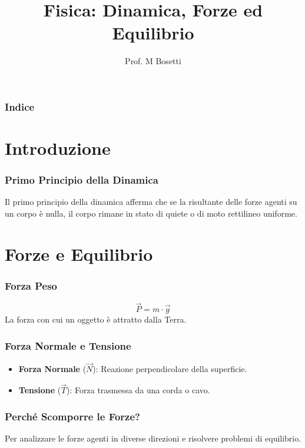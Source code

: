 \documentclass{beamer}
\title{Fisica: Dinamica, Forze ed Equilibrio}
\author{Prof. M Bosetti}
\date{}
\begin{document}
\frame{\titlepage}

\begin{frame}
\frametitle{Indice}
\tableofcontents
\end{frame}

\section{Introduzione}

\begin{frame}
\frametitle{Primo Principio della Dinamica}
Il primo principio della dinamica afferma che se la risultante delle forze agenti su un corpo è nulla, il corpo rimane in stato di quiete o di moto rettilineo uniforme.
\end{frame}

\section{Forze e Equilibrio}

\begin{frame}
\frametitle{Forza Peso}
\begin{equation*}
\vec{P} = m \cdot \vec{g}
\end{equation*}
La forza con cui un oggetto è attratto dalla Terra.
\end{frame}

\begin{frame}
\frametitle{Forza Normale e Tensione}
\begin{itemize}
    \item \textbf{Forza Normale} ($\vec{N}$): Reazione perpendicolare della superficie.
    \item \textbf{Tensione} ($\vec{T}$): Forza trasmessa da una corda o cavo.
\end{itemize}
\end{frame}


\begin{frame}
\frametitle{Perché Scomporre le Forze?}
Per analizzare le forze agenti in diverse direzioni e risolvere problemi di equilibrio.
\end{frame}
\end{document}
